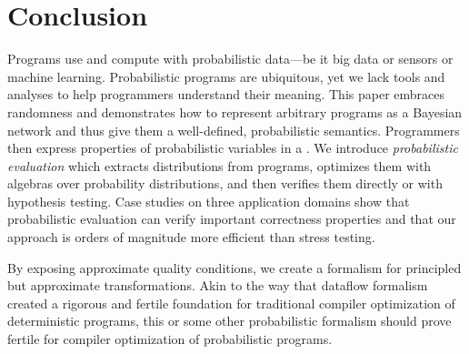 
\section{Conclusion}
Programs use and compute with probabilistic data---be it big data or
sensors or machine learning.  Probabilistic programs are ubiquitous,
yet we lack tools and analyses to help programmers understand their
meaning. This paper embraces randomness and demonstrates how to
represent arbitrary programs as a Bayesian network and thus give them
a well-defined, probabilistic semantics.  Programmers then express
properties of probabilistic variables in a \passert.  We introduce
\emph{probabilistic evaluation} which extracts distributions from
programs, optimizes them with algebras over probability distributions,
and then verifies them directly or with hypothesis testing.  Case
studies on three application domains show that probabilistic evaluation
can verify important correctness properties
and that our approach is orders of
magnitude more efficient than stress testing.


By exposing approximate quality conditions, we create a
formalism for principled but approximate transformations.  Akin to the
way that dataflow formalism created a rigorous and fertile foundation
for traditional compiler optimization of deterministic programs, this
or some other probabilistic formalism should prove fertile for compiler optimization
of probabilistic programs.


 
